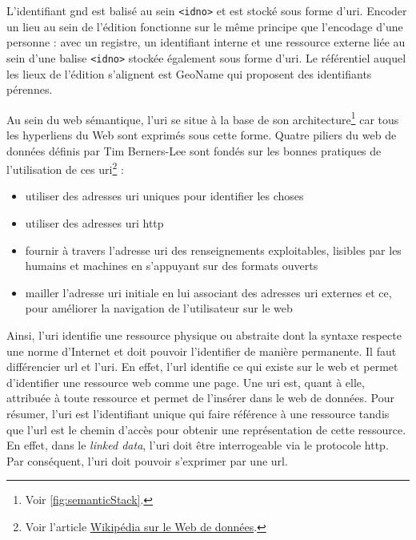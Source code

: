 \documentclass[a4paper, 12pt, twoside]{book}
\begin{document}
L'identifiant \gls{gnd} est balisé au sein \texttt{<idno>} et est stocké sous forme d'\gls{uri}. Encoder un lieu au sein de l'édition fonctionne sur le même principe que l'encodage d'une personne : avec un registre, un identifiant interne et une ressource externe liée au sein d'une balise \texttt{<idno>} stockée également sous forme d'\gls{uri}. Le référentiel auquel les lieux de l'édition s'alignent est GeoName qui proposent des identifiants pérennes.

Au sein du web sémantique, l'\gls{uri} se situe à la base de son architecture\footnote{Voir \autoref{fig:semanticStack}.} car tous les hyperliens du Web sont exprimés sous cette forme.
Quatre piliers du web de données définis par Tim Berners-Lee sont fondés sur les bonnes pratiques de l'utilisation de ces \gls{uri}\footnote{Voir l'article \href{https://fr.wikipedia.org/wiki/Web_des_données}{Wikipédia sur le Web de données}.} :
\begin{itemize}
    \item utiliser des adresses \gls{uri} uniques pour identifier les choses
    \item utiliser des adresses \gls{uri} \gls{http}
    \item fournir à travers l'adresse \gls{uri} des renseignements exploitables, lisibles par les humains et machines en s'appuyant sur des formats ouverts
    \item mailler l'adresse \gls{uri} initiale en lui associant des adresses \gls{uri} externes et ce, pour améliorer la navigation de l'utilisateur sur le web
\end{itemize}
Ainsi, l'\gls{uri} identifie une ressource physique ou abstraite dont la syntaxe respecte une norme d'Internet et doit pouvoir l'identifier de manière permanente. Il faut différencier \gls{url} et l'\gls{uri}. En effet, l'\gls{url} identifie ce qui existe sur le web et permet d'identifier une ressource web comme une page. Une \gls{uri} est, quant à elle, attribuée à toute ressource et permet de l'insérer dans le web de données. Pour résumer, l'\gls{uri} est l'identifiant unique qui faire référence à une ressource tandis que l'\gls{url} est le chemin d'accès pour obtenir une représentation de cette ressource. En effet, dans le \textit{linked data}, l'\gls{uri} doit être interrogeable via le protocole \gls{http}. Par conséquent, l'\gls{uri} doit pouvoir s'exprimer par une \gls{url}. 
\end{document}
